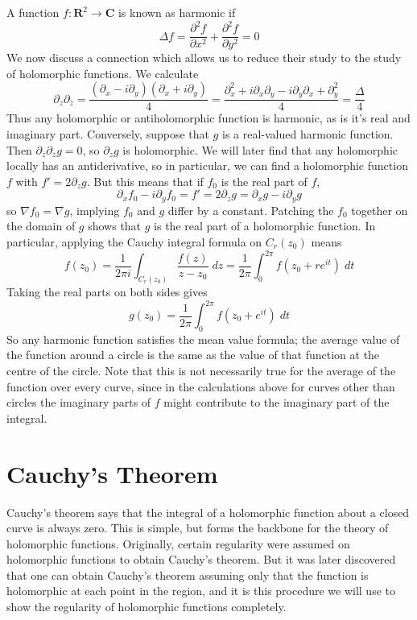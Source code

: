 A function $f: \mathbf{R}^2 \to \mathbf{C}$ is known as harmonic if
%
\[ \Delta f = \frac{\partial^2 f}{\partial x^2} + \frac{\partial^2 f}{\partial y^2} = 0 \]
%
We now discuss a connection which allows us to reduce their study to the study of holomorphic functions. We calculate
%
\[ \partial_z \partial_{\overline{z}} = \frac{(\partial_x - i \partial_y)(\partial_x + i \partial_y)}{4} = \frac{\partial^2_x + i \partial_x \partial_y - i \partial_y \partial_x + \partial_y^2}{4} = \frac{\Delta}{4} \]
%
Thus any holomorphic or antiholomorphic function is harmonic, as is it's real and imaginary part. Conversely, suppose that $g$ is a real-valued harmonic function. Then $\partial_{\overline{z}} \partial_z g = 0$, so $\partial_z g$ is holomorphic. We will later find that any holomorphic locally has an antiderivative, so in particular, we can find a holomorphic function $f$ with $f' = 2 \partial_z g$. But this means that if $f_0$ is the real part of $f$,
%
\[ \partial_x f_0 - i \partial_y f_0 = f' = 2 \partial_z g = \partial_x g - i \partial_y g \]
%
so $\nabla f_0 = \nabla g$, implying $f_0$ and $g$ differ by a constant. Patching the $f_0$ together on the domain of $g$ shows that $g$ is the real part of a holomorphic function. In particular, applying the Cauchy integral formula on $C_r(z_0)$ means
%
\[ f(z_0) = \frac{1}{2 \pi i} \int_{C_r(z_0)} \frac{f(z)}{z - z_0}\; dz = \frac{1}{2\pi} \int_0^{2\pi} f(z_0 + r e^{it})\; dt  \]
%
Taking the real parts on both sides gives
%
\[ g(z_0) = \frac{1}{2\pi} \int_0^{2\pi} f(z_0 + e^{it})\; dt \]
%
So any harmonic function satisfies the mean value formula; the average value of the function around a circle is the same as the value of that function at the centre of the circle. Note that this is not necessarily true for the average of the function over every curve, since in the calculations above for curves other than circles the imaginary parts of $f$ might contribute to the imaginary part of the integral.







\chapter{Cauchy's Theorem}

Cauchy's theorem says that the integral of a holomorphic function about a closed curve is always zero. This is simple, but forms the backbone for the theory of holomorphic functions. Originally, certain regularity were assumed on holomorphic functions to obtain Cauchy's theorem. But it was later discovered that one can obtain Cauchy's theorem assuming only that the function is holomorphic at each point in the region, and it is this procedure we will use to show the regularity of holomorphic functions completely.

